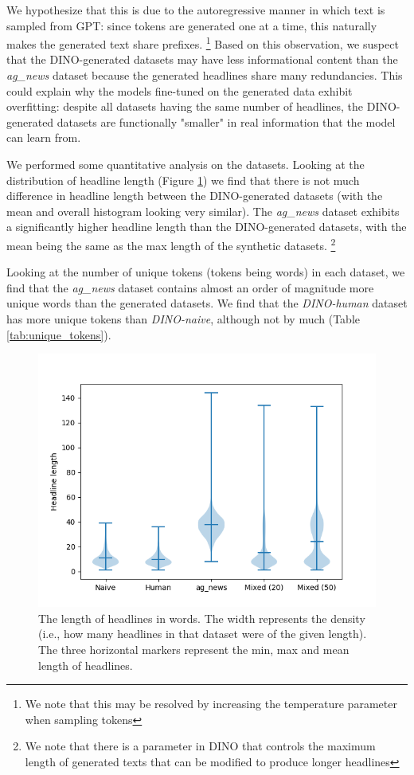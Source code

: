 \documentclass[11pt]{article}
\begin{document}
We hypothesize that this is due to the autoregressive manner in which text is sampled from GPT: since tokens are generated one at a time, this naturally makes the generated text share prefixes. \footnote{We note that this may be resolved by increasing the temperature parameter when sampling tokens} Based on this observation, we suspect that the DINO-generated datasets may have less informational content than the \textit{ag\_news} dataset because the generated headlines share many redundancies. This could explain why the models fine-tuned on the generated data exhibit overfitting: despite all datasets having the same number of headlines, the DINO-generated datasets are functionally "smaller" in real information that the model can learn from.

We performed some quantitative analysis on the datasets. Looking at the distribution of headline length (Figure \ref{fig:violin}) we find that there is not much difference in headline length between the DINO-generated datasets (with the mean and overall histogram looking very similar). The \textit{ag\_news} dataset exhibits a significantly higher headline length than the DINO-generated datasets, with the mean being the same as the max length of the synthetic datasets. \footnote{We note that there is a parameter in DINO that controls the maximum length of generated texts that can be modified to produce longer headlines}

Looking at the number of unique tokens (tokens being words) in each dataset, we find that the \textit{ag\_news} dataset contains almost an order of magnitude more unique words than the generated datasets. We find that the \textit{DINO-human} dataset has more unique tokens than \textit{DINO-naive}, although not by much (Table \ref{tab:unique_tokens}).

\begin{figure}[t]
    \centering
    \includegraphics[scale=0.5]{figures/violin_plots.png}
    \caption{The length of headlines in words. The width represents the density (i.e., how many headlines in that dataset were of the given length). The three horizontal markers represent the min, max and mean length of headlines.}
    \label{fig:violin}
\end{figure}
\end{document}
